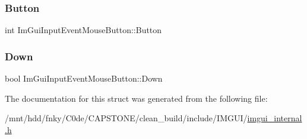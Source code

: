 \subsubsection{\texorpdfstring{Button}{Button}}
{\footnotesize\ttfamily int Im\+Gui\+Input\+Event\+Mouse\+Button\+::\+Button}

\mbox{\label{structImGuiInputEventMouseButton_a9a669f2168a719da17c26dc3ad154d65}} 
\subsubsection{\texorpdfstring{Down}{Down}}
{\footnotesize\ttfamily bool Im\+Gui\+Input\+Event\+Mouse\+Button\+::\+Down}



The documentation for this struct was generated from the following file\+:\begin{DoxyCompactItemize}
\item 
/mnt/hdd/fnky/\+C0de/\+C\+A\+P\+S\+T\+O\+N\+E/clean\+\_\+build/include/\+I\+M\+G\+U\+I/\hyperlink{imgui__internal_8h}{imgui\+\_\+internal.\+h}\end{DoxyCompactItemize}

